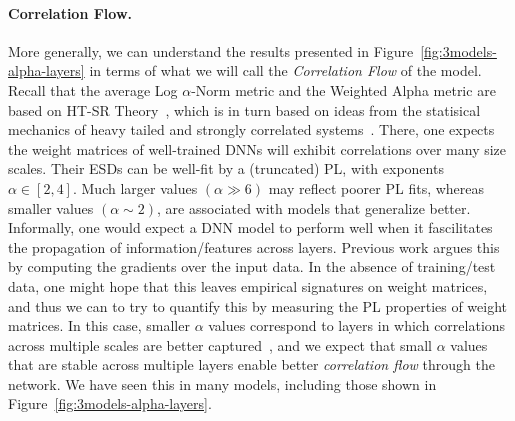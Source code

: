\paragraph{Correlation Flow.}

More generally, we can understand the results presented in Figure~\ref{fig:3models-alpha-layers} in terms of what we will call the \emph{Correlation Flow} of the model. 
Recall that the average Log $\alpha$-Norm metric and the Weighted Alpha metric are based on HT-SR Theory~\cite{MM18_TR, MM19_HTSR_ICML, MM20_SDM}, which is in turn based on ideas from the statisical mechanics of heavy tailed and strongly correlated systems~\cite{BouchaudPotters03, SornetteBook, BP11, bun2017}. 
There, one expects the weight matrices of well-trained DNNs will exhibit correlations over many size scales. 
Their ESDs can be well-fit by a (truncated) PL, with exponents $\alpha\in[2,4]$.
Much larger values $(\alpha\gg 6)$ may reflect poorer PL fits, whereas smaller values $(\alpha\sim 2)$, are associated with models that generalize better.
Informally, one would expect a DNN model to perform well when it fascilitates the propagation of information/features across layers.
Previous work argues this by computing the gradients over the input data.
In the absence of training/test data, one might hope that this leaves empirical signatures on weight matrices, and thus we can to try to quantify this by measuring the PL properties of weight matrices.
In this case, smaller $\alpha$ values correspond to layers in which correlations across multiple scales are better captured~\cite{MM18_TR,SornetteBook}, and we expect that small $\alpha$ values that are stable across multiple layers enable better \emph{correlation flow} through the network.
We have seen this in many models, including those shown in Figure~\ref{fig:3models-alpha-layers}.


